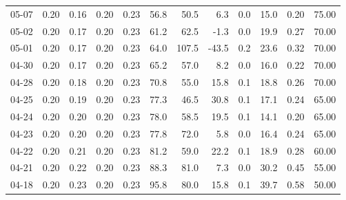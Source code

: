 \begin{threeparttable}
{\begin{tabular}{lrrrrrrrrrrr}
  05-07 &          0.20 &          0.16 &          0.20 &        0.23 &                56.8 &                50.5 &        6.3 &                 0.0 &             15.0 &            0.20 &                  75.00 \\
  05-02 &          0.20 &          0.17 &          0.20 &        0.23 &                61.2 &                62.5 &       -1.3 &                 0.0 &             19.9 &            0.27 &                  70.00 \\
  05-01 &          0.20 &          0.17 &          0.20 &        0.23 &                64.0 &               107.5 &      -43.5 &                 0.2 &             23.6 &            0.32 &                  70.00 \\
  04-30 &          0.20 &          0.17 &          0.20 &        0.23 &                65.2 &                57.0 &        8.2 &                 0.0 &             16.0 &            0.22 &                  70.00 \\
  04-28 &          0.20 &          0.18 &          0.20 &        0.23 &                70.8 &                55.0 &       15.8 &                 0.1 &             18.8 &            0.26 &                  70.00 \\
  04-25 &          0.20 &          0.19 &          0.20 &        0.23 &                77.3 &                46.5 &       30.8 &                 0.1 &             17.1 &            0.24 &                  65.00 \\
  04-24 &          0.20 &          0.20 &          0.20 &        0.23 &                78.0 &                58.5 &       19.5 &                 0.1 &             14.1 &            0.20 &                  65.00 \\
  04-23 &          0.20 &          0.20 &          0.20 &        0.23 &                77.8 &                72.0 &        5.8 &                 0.0 &             16.4 &            0.24 &                  65.00 \\
  04-22 &          0.20 &          0.21 &          0.20 &        0.23 &                81.2 &                59.0 &       22.2 &                 0.1 &             18.9 &            0.28 &                  60.00 \\
  04-21 &          0.20 &          0.22 &          0.20 &        0.23 &                88.3 &                81.0 &        7.3 &                 0.0 &             30.2 &            0.45 &                  55.00 \\
  04-18 &          0.20 &          0.23 &          0.20 &        0.23 &                95.8 &                80.0 &       15.8 &                 0.1 &             39.7 &            0.58 &                  50.00 \\

\end{tabular}}
\end{threeparttable}
